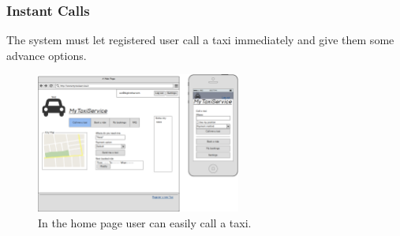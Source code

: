 		\subsubsection {Instant Calls}
			The system must let registered user call a taxi immediately and give them some advance options.
			\begin{figure}[h!]
				\includegraphics[width=0.6\textwidth]{homelog}
				\caption{In the home page user can easily call a taxi.}
			\end{figure}
			\newpage






